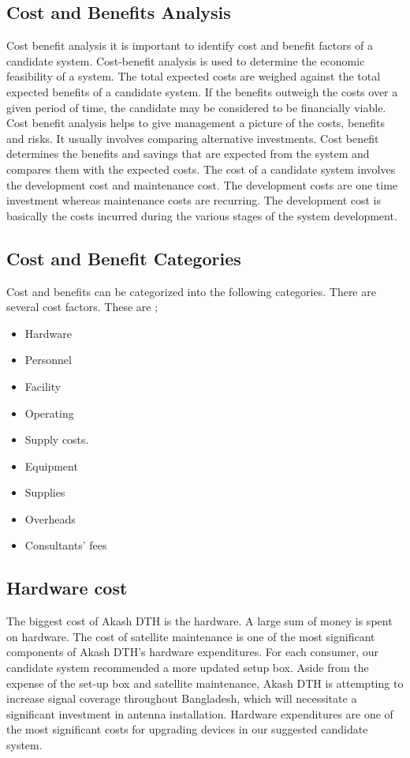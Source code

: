 \begin{spacing}{1}
\section{Cost and Benefits Analysis }
Cost benefit analysis  it is important to identify cost and benefit factors of a candidate system. Cost-benefit analysis is used to determine the economic feasibility of a system. The total expected costs are weighed against the total expected benefits of a candidate system. If the benefits outweigh the costs over a given period of time, the candidate may be considered to be financially viable.
Cost benefit analysis helps to give management a picture of the costs, benefits and risks. It usually involves comparing alternative investments.
Cost benefit determines the benefits and savings that are expected from the system and compares them with the expected costs.
The cost of a candidate system involves the development cost and maintenance cost. The development costs are one time investment whereas maintenance costs are recurring. The development cost is basically the costs incurred during the various stages of the system development.
\subsection{ Cost and Benefit Categories }
Cost and benefits can be categorized into the following categories.
There are several cost factors. These are ;

\begin {itemize}
\item  Hardware
\item Personnel
\item Facility
\item Operating 
\item Supply costs.
\item Equipment
\item Supplies
\item Overheads
\item Consultants' fees
\end {itemize}

\subsection{Hardware cost}
The biggest cost of Akash DTH is the hardware. A large sum of money is spent on hardware. The cost of satellite maintenance is one of the most significant components of Akash DTH's hardware expenditures. For each consumer, our candidate system recommended a more updated setup box. Aside from the expense of the set-up box and satellite maintenance, Akash DTH is attempting to increase signal coverage throughout Bangladesh, which will necessitate a significant investment in antenna installation.
Hardware expenditures are one of the most significant costs for upgrading devices in our suggested candidate system.

\end{spacing}

